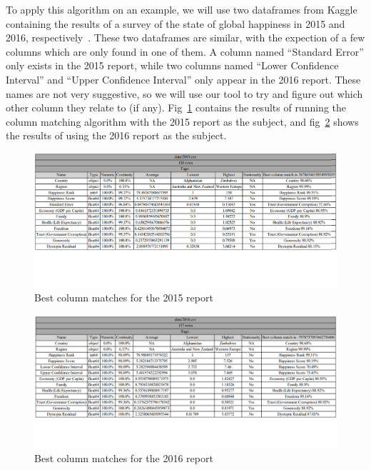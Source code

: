 To apply this algorithm on an example, we will use two dataframes from Kaggle containing the results of a survey of the
state of global happiness in 2015 and 2016, respectively~\cite{kaggleWorldHappinessReport}.
These two dataframes are similar, with the expection of a few columns which are only found in one of them.
A column named ``Standard Error'' only exists in the 2015 report, while two columns named ``Lower Confidence Interval'' and
``Upper Confidence Interval'' only appear in the 2016 report.
These names are not very suggestive, so we will use our tool to try and figure out which other column they relate to (if any).
Fig~\ref{fig:2015_column_match} contains the results of running the column matching algorithm with the 2015 report as the subject,
and fig~\ref{fig:2016_column_match} shows the results of using the 2016 report as the subject.

\begin{figure}[h]
    \centering
    \includegraphics[width=12cm]{figures/best_column_match_id/2015_column_match}
    \caption{Best column matches for the 2015 report}
    \label{fig:2015_column_match}
\end{figure}

\begin{figure}[h]
    \centering
    \includegraphics[width=12cm]{figures/best_column_match_id/2016_column_match}
    \caption{Best column matches for the 2016 report}
    \label{fig:2016_column_match}
\end{figure}

